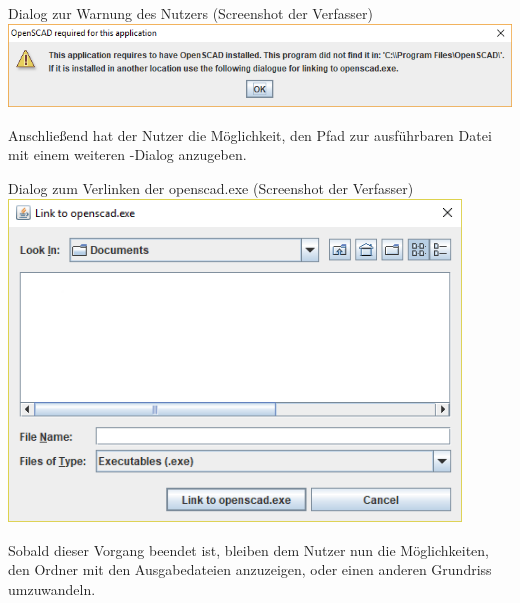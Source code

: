 \begin{Bild}{Dialog zur Warnung des Nutzers (Screenshot der Verfasser)}
	\includegraphics[width = \textwidth]{Bilder/GUI/GUI_SCAD_Error}
\end{Bild}

Anschließend hat der Nutzer die Möglichkeit, den Pfad zur ausführbaren Datei mit einem weiteren -Dialog anzugeben.

\begin{Bild}{Dialog zum Verlinken der openscad.exe (Screenshot der Verfasser)}
	\includegraphics[width = 120mm]{Bilder/GUI/GUI_SCAD_Linking}
\end{Bild}

Sobald dieser Vorgang beendet ist, bleiben dem Nutzer nun die Möglichkeiten, den Ordner mit den Ausgabedateien anzuzeigen, oder einen anderen Grundriss umzuwandeln.\\